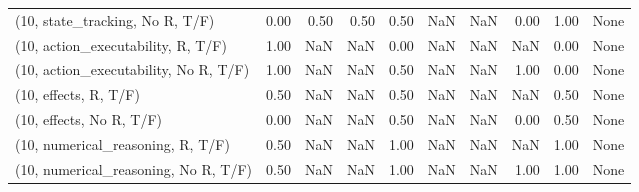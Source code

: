 \begin{table*}[h!]
\begin{adjustbox}{width=2\columnwidth,center}
\begin{tabular}{lrrr|rrr|rrr}
(10, state\_tracking, No R, T/F)       &                      0.00 &                  0.50 &                      0.50 &                          0.50 &                       NaN &                           NaN &                                   0.00 &                               1.00 &                                  None \\
(10, action\_executability, R, T/F)    &                      1.00 &                   NaN &                       NaN &                          0.00 &                       NaN &                           NaN &                                    NaN &                               0.00 &                                  None \\
(10, action\_executability, No R, T/F) &                      1.00 &                   NaN &                       NaN &                          0.50 &                       NaN &                           NaN &                                   1.00 &                               0.00 &                                  None \\
(10, effects, R, T/F)                 &                      0.50 &                   NaN &                       NaN &                          0.50 &                       NaN &                           NaN &                                    NaN &                               0.50 &                                  None \\
(10, effects, No R, T/F)              &                      0.00 &                   NaN &                       NaN &                          0.50 &                       NaN &                           NaN &                                   0.00 &                               0.50 &                                  None \\
(10, numerical\_reasoning, R, T/F)     &                      0.50 &                   NaN &                       NaN &                          1.00 &                       NaN &                           NaN &                                    NaN &                               1.00 &                                  None \\
(10, numerical\_reasoning, No R, T/F)  &                      0.50 &                   NaN &                       NaN &                          1.00 &                       NaN &                           NaN &                                   1.00 &                               1.00 &                                  None \\

\end{tabular}
\end{adjustbox}
\end{table*}
